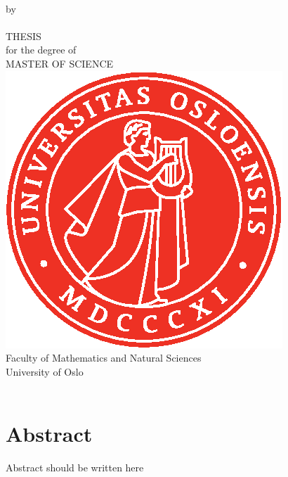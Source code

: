 \thispagestyle{empty}
\begin{center} \vspace{1cm}
    \textbf{\Large{\mtitle}}\\ \vspace{0.5cm}
    \small{by}\\ \vspace{0.5cm}
    \large{\mauthor}\\ \vspace{4.4cm}
    \large{THESIS}\\ \vspace{0.3cm}
    \small{for the degree of}\\ \vspace{0.3cm}
    \large{MASTER OF SCIENCE}\\ \vspace{0.7cm}
    \includegraphics[scale=1.0]{Images/UiO_Segl_pms485.eps} \\ \vspace{0.5cm}
    \large{Faculty of Mathematics and Natural Sciences \\ University of Oslo} \\ \vspace{0.5cm}
    \small{\mdate}\\ \vfill
\end{center}

\newpage
\section*{Abstract}
    Abstract should be written here

